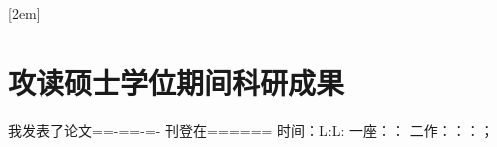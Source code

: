 
[2em]{\vspace{.5\baselineskip}\xiaosan\song}%
             {\prechaptername\CJKnumber{\thecontentslabel}\postchaptername\qquad}{} %
             {}             %
\chapter*{攻读硕士学位期间科研成果}

我发表了论文==-==-=-
刊登在======
时间：L:L:
一座：：
二作：：：；
\thispagestyle{empty}
